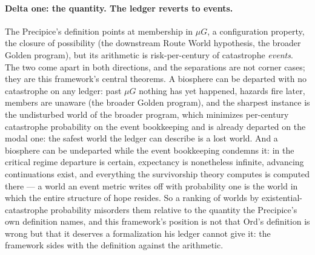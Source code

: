 \paragraph{Delta one: the quantity. The ledger reverts to events.}
The Precipice's definition points at membership in $\mu G$, a
configuration property, the closure of possibility
(the downstream Route World hypothesis,
the broader Golden program), but its arithmetic is
risk-per-century of catastrophe \emph{events}. The two come apart in
both directions, and the separations are not corner cases; they are
this framework's central theorems. A biosphere can be departed with no
catastrophe on any ledger: past $\mu G$ nothing has yet happened, hazards fire later, members are unaware
(the broader Golden program), and the sharpest instance is
the undisturbed world of the broader program, which minimizes
per-century catastrophe probability on the event bookkeeping and is
already departed on the modal one: the safest world the ledger can
describe is a lost world. And a biosphere can be undeparted while the
event bookkeeping condemns it: in the critical regime departure is
certain, expectancy is nonetheless infinite, advancing continuations
exist, and everything the survivorship theory computes is computed
there --- a world an event metric writes off with probability one is
the world in which the entire structure of hope resides. So a ranking
of worlds by existential-catastrophe probability misorders them
relative to the quantity the Precipice's own definition names, and
this framework's position is not that Ord's definition is wrong but
that it deserves a formalization his ledger cannot give it: the
framework sides with the definition against the arithmetic.

